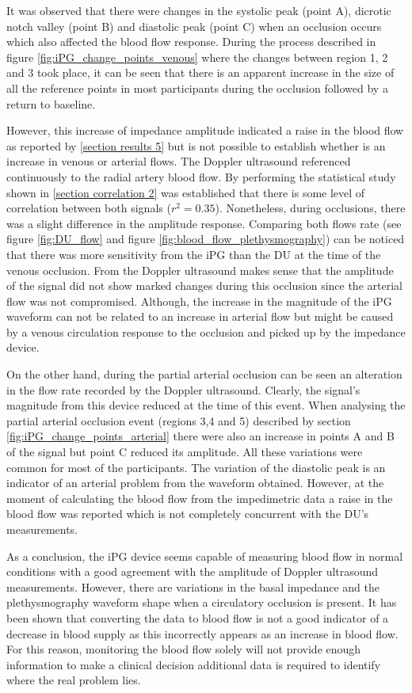 It was observed that there were changes in the systolic peak (point A), dicrotic notch valley (point B) and diastolic peak (point C) when an occlusion occurs which also affected the blood flow response. During the process described in figure \ref{fig:iPG_change_points_venous} where the changes between region 1, 2 and 3 took place, it can be seen that there is an apparent increase in the size of all the reference points in most participants during the occlusion followed by a return to baseline. 
	
However, this increase of impedance amplitude indicated a raise in the blood flow as reported by \ref{section results 5} but is not possible to establish whether is an increase in venous or arterial flows. The Doppler ultrasound referenced continuously to the radial artery blood flow. By performing the statistical study shown in \ref{section correlation 2} was established that there is some level of correlation between both signals ($r^2 = 0.35$). Nonetheless, during occlusions, there was a slight difference in the amplitude response. Comparing both flows rate (see figure \ref{fig:DU_flow} and figure \ref{fig:blood_flow_plethysmography}) can be noticed that there was more sensitivity from the iPG than the DU at the time of the venous occlusion. From the Doppler ultrasound makes sense that the amplitude of the signal did not show marked changes during this occlusion since the arterial flow was not compromised. Although, the increase in the magnitude of the iPG waveform can not be related to an increase in arterial flow but might be caused by a venous circulation response to the occlusion and picked up by the impedance device. 

On the other hand, during the partial arterial occlusion can be seen an alteration in the flow rate recorded by the Doppler ultrasound. Clearly, the signal's magnitude from this device reduced at the time of this event. When analysing the partial arterial occlusion event (regions 3,4 and 5) described by section \ref{fig:iPG_change_points_arterial} there were also an increase in points A  and B of the signal but point C reduced its amplitude. All these variations were common for most of the participants. The variation of the diastolic peak is an indicator of an arterial problem from the waveform obtained. However, at the moment of calculating the blood flow from the impedimetric data a raise in the blood flow was reported which is not completely concurrent with the DU's measurements. 

As a conclusion, the iPG device seems capable of measuring blood flow in normal conditions with a good agreement with the amplitude of Doppler ultrasound measurements. However, there are variations in the basal impedance and the plethysmography waveform shape when a circulatory occlusion is present. It has been shown that converting the data to blood flow is not a good indicator of a decrease in blood supply as this incorrectly appears as an increase in blood flow. For this reason, monitoring the blood flow solely will not provide enough information to make a clinical decision additional data is required to identify where the real problem lies.    



